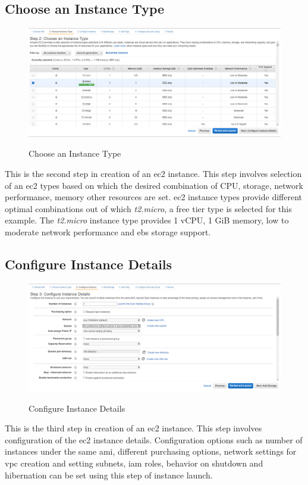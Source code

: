 \documentclass{home_assignment}
\begin{document}
\subsection{Choose an Instance Type}
\begin{figure}[H]
    \centering
    \includegraphics[frame,width=\linewidth]{../Figures/b.png}
    \label{fig:b}
    \caption{Choose an Instance Type}
\end{figure}
This is the second step in creation of an \acrshort{ec2} instance. This step involves selection of an \acrshort{ec2} types based on which the desired combination of CPU, storage, network performance, memory other resources are set. \acrfull{ec2} instance types provide different optimal combinations out of which \textit{t2.micro}, a free tier type is selected for this example. The \textit{t2.micro} instance type provides 1 vCPU, 1 GiB memory, low to moderate network performance and \acrshort{ebs} storage support.

\subsection{Configure Instance Details}
\begin{figure}[H]
    \centering
    \includegraphics[frame,width=\linewidth]{../Figures/c.png}
    \label{fig:c}
    \caption{Configure Instance Details}
\end{figure}
This is the third step in creation of an \acrshort{ec2} instance. This step involves configuration of the \acrshort{ec2} instance details. Configuration options such as number of instances under the same \acrshort{ami}, different purchasing options, network settings for \acrshort{vpc} creation and setting subnets, \acrshort{iam} roles, behavior on shutdown and hibernation can be set using this step of instance launch.
\end{document}
